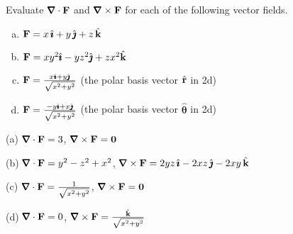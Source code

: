 \subsection*{\Procedural}

\begin{question}
Evaluate $\vnabla\cdot\vF$ and $\vnabla\times\vF$ for each of
the following vector fields.
\begin{enumerate}[(a)]
\item $\mathbf{F}=x\,\hat{\pmb{\imath}}+y\,\hat{\pmb{\jmath}}+z\,\hat{\mathbf{k}}$ 
\item $\mathbf{F}=xy^2\hat{\pmb{\imath}}-yz^2\hat{\pmb{\jmath}}+zx^2\hat{\mathbf{k}}$ 
\item $\mathbf{F}=\frac{x\hat{\pmb{\imath}}+y\hat{\pmb{\jmath}}}{\sqrt{x^2+y^2}}$ 
               (the polar basis vector $\hat{\bf r}$ in 2d)
\item
$\mathbf{F}=\frac{-y\hat{\pmb{\imath}}+x\hat{\pmb{\jmath}}}{\sqrt{x^2+y^2}}$ 
      (the polar basis vector $\hat{\pmb{\theta}}$ in 2d)
\end{enumerate}

\end{question}


\begin{answer} 
(a) $\vnabla\cdot\vF=3$, $\vnabla\times\vF=\vZero$

(b) $\vnabla\cdot\vF=y^2-z^2+x^2$, 
    $\vnabla\times\vF=2yz\,\hi-2xz\,\hj-2xy\,\hk$

(c) $\vnabla\cdot\vF=\frac{1}{\sqrt{x^2+y^2}}$, 
    $\vnabla\times\vF=\vZero$

(d) $\vnabla\cdot\vF=0$, $\vnabla\times\vF=\frac{\hk}{\sqrt{x^2+y^2}}$

\end{answer}

